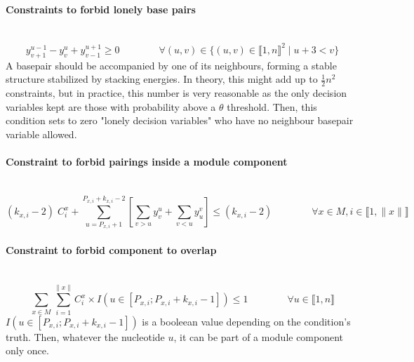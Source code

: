 \documentclass{article}
\begin{document}
\paragraph{Constraints to forbid lonely base pairs} ~
\begin{equation} \label{constraint:2}
	y^{u-1}_{v+1} - y^u_v + y^{u+1}_{v-1} \geq 0 \qquad \qquad \forall (u,v) \in \{ (u,v) \in \llbracket 1,n\rrbracket^2 \; | \; u + 3 <v \}
\end{equation}
A basepair should be accompanied by one of its neighbours, forming a stable structure stabilized by stacking energies. In theory, this might add up to \( \frac{1}{2}n^2\) constraints, but in practice, this number is very reasonable as
the only decision variables kept are those with probability above a $\theta$ threshold. 
Then, this condition sets to zero "lonely decision variables" who have no neighbour basepair variable allowed.


\paragraph{Constraint to forbid pairings inside a module component} ~ 
\begin{equation} \label{constraint:4}
	(k_{x,i}-2) \; C^x_i + \sum_{u=P_{x,i}+1}^{P_{x,i}+k_{x,i}-2}\left[ \sum_{v>u} y^u_v + \sum_{v<u} y^v_u \right] \leq (k_{x,i} - 2)
	\qquad \qquad \forall x \in M, i \in \llbracket 1,\|x\| \rrbracket
\end{equation}

\paragraph{Constraint to forbid component to overlap} ~
\begin{equation} \label{constraint:5}
	\sum_{x \in M} \sum_{i=1}^{\|x\|} C^x_i \times I( u \in [ P_{x,i} ; P_{x,i}+k_{x,i}-1]) \leq 1 \qquad \qquad \forall u \in \llbracket 1,n \rrbracket
\end{equation}
$I( u \in [ P_{x,i} ; P_{x,i}+k_{x,i}-1])$ is a booleean value depending on the condition's truth. Then, whatever the nucleotide $u$, it can be part of a module component only once.
\end{document}
